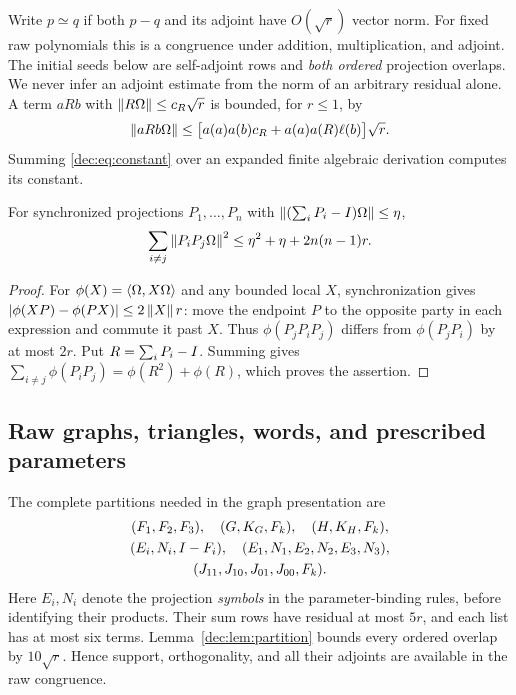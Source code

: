 Write $p\simeq q$ if both $p-q$ and its adjoint have $O(\sqrt r)$ vector norm. For fixed raw polynomials this is a congruence under addition, multiplication, and adjoint. The initial seeds below are self-adjoint rows and \emph{both ordered} projection overlaps. We never infer an adjoint estimate from the norm of an arbitrary residual alone. A term $aRb$ with $\left\lVert R\Omega\right\rVert\le c_R\sqrt r$ is bounded, for $r\le1$, by
\begin{equation}\label{dec:eq:constant}
\left\lVert aRb\Omega\right\rVert\le
\bigl[a(a)a(b)c_R+a(a)a(R)\ell(b)\bigr]\sqrt r.
\end{equation}
Summing \eqref{dec:eq:constant} over an expanded finite algebraic derivation computes its constant.

\begin{lemma}\label{dec:lem:partition}
For synchronized projections $P_1,\ldots,P_n$ with
$\left\lVert(\sum_iP_i-I)\Omega\right\rVert\le\eta$,
\begin{equation}\label{dec:eq:overlaps}
\sum_{i\ne j}\left\lVert P_iP_j\Omega\right\rVert^2
\le\eta^2+\eta+2n(n-1)r.
\end{equation}
\end{lemma}
\begin{proof}
For $\phi(X)=\left\langle\Omega,X\Omega\right\rangle$ and any bounded local $X$, synchronization gives
$|\phi(XP)-\phi(PX)|\le2\left\lVert X\right\rVert r$: move the endpoint $P$ to the opposite party in each expression and commute it past $X$. Thus
$\phi(P_jP_iP_j)$ differs from $\phi(P_jP_i)$ by at most $2r$. Put $R=\sum_iP_i-I$. Summing gives
$\sum_{i\ne j}\phi(P_iP_j)=\phi(R^2)+\phi(R)$, which proves the assertion.
\end{proof}

\subsection{Raw graphs, triangles, words, and prescribed parameters}\label{dec:sec:raw}
The complete partitions needed in the graph presentation are
\[
\begin{gathered}
(F_1,F_2,F_3),\quad(G,K_G,F_k),\quad(H,K_H,F_k),\\
(E_i,N_i,I-F_i),\quad(E_1,N_1,E_2,N_2,E_3,N_3),\\
(J_{11},J_{10},J_{01},J_{00},F_k).
\end{gathered}
\]
Here $E_i,N_i$ denote the projection \emph{symbols} in the parameter-binding rules, before identifying their products. Their sum rows have residual at most $5r$, and each list has at most six terms. Lemma~\ref{dec:lem:partition} bounds every ordered overlap by $10\sqrt r$. Hence support, orthogonality, and all their adjoints are available in the raw congruence.

